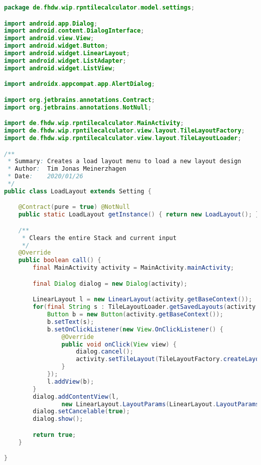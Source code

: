 \begin{lstlisting}[caption=LoadLayout (Meinerzhagen),label=list:LoadLayout,language=Java]
package de.fhdw.wip.rpntilecalculator.model.settings;

import android.app.Dialog;
import android.content.DialogInterface;
import android.view.View;
import android.widget.Button;
import android.widget.LinearLayout;
import android.widget.ListAdapter;
import android.widget.ListView;

import androidx.appcompat.app.AlertDialog;

import org.jetbrains.annotations.Contract;
import org.jetbrains.annotations.NotNull;

import de.fhdw.wip.rpntilecalculator.MainActivity;
import de.fhdw.wip.rpntilecalculator.view.layout.TileLayoutFactory;
import de.fhdw.wip.rpntilecalculator.view.layout.TileLayoutLoader;

/**
 * Summary: Creates a load layout menu to load a new layout design
 * Author:  Tim Jonas Meinerzhagen
 * Date:    2020/01/26
 */
public class LoadLayout extends Setting {

    @Contract(pure = true) @NotNull
    public static LoadLayout getInstance() { return new LoadLayout(); }

    /**
     * Clears the entire Stack and current input
     */
    @Override
    public boolean call() {
        final MainActivity activity = MainActivity.mainActivity;

        final Dialog dialog = new Dialog(activity);

        LinearLayout l = new LinearLayout(activity.getBaseContext());
        for(final String s : TileLayoutLoader.getSavedLayouts(activity.getBaseContext())){
            Button b = new Button(activity.getBaseContext());
            b.setText(s);
            b.setOnClickListener(new View.OnClickListener() {
                @Override
                public void onClick(View view) {
                    dialog.cancel();
                    activity.setTileLayout(TileLayoutFactory.createLayout(activity.getBaseContext(), s));
                }
            });
            l.addView(b);
        }
        dialog.addContentView(l,
                new LinearLayout.LayoutParams(LinearLayout.LayoutParams.WRAP_CONTENT, LinearLayout.LayoutParams.WRAP_CONTENT));
        dialog.setCancelable(true);
        dialog.show();

        return true;
    }

}
\end{lstlisting}    

